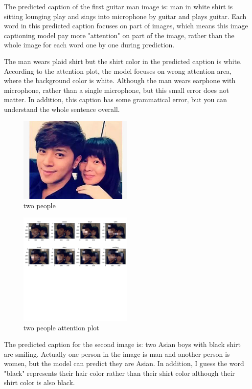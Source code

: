 \documentclass{article}
\begin{document}
The predicted caption of the first guitar man image is: man in white shirt is sitting lounging play and sings into microphone by guitar and plays guitar. Each word in this predicted caption focuses on part of images, which means this image captioning model pay more "attention" on part of the image, rather than the whole image for each word one by one during prediction.

The man wears plaid shirt but the shirt color in the predicted caption is white. According to the attention plot, the model focuses on wrong attention area, where the background color is white. Although the man wears earphone with microphone, rather than a single microphone, but this small error does not matter. In addition, this caption has some grammatical error, but you can understand the whole sentence overall.

\begin{figure}[h]
\centering
\includegraphics[width=0.5\textwidth]{luozhixiang.jpg}
\caption{two people}
\label{fig7}
\end{figure}

\begin{figure}[h]
\centering
\includegraphics[width=0.5\textwidth]{attention_plot.png}
\caption{two people attention plot}
\label{fig8}
\end{figure}

The predicted caption for the second image is: two Asian boys with black shirt are smiling. Actually one person in the image is man and another person is women, but the model can predict they are Asian. In addition, I guess the word "black" represents their hair color rather than their shirt color although their shirt color is also black.
\end{document}
